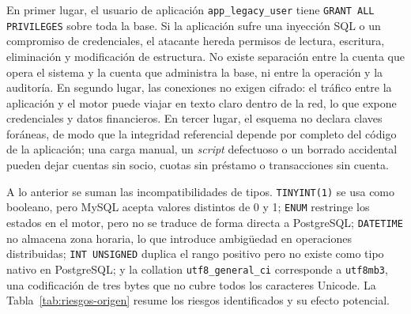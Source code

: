 En primer lugar, el usuario de aplicación \texttt{app\_legacy\_user} tiene
\texttt{GRANT ALL PRIVILEGES} sobre toda la base. Si la aplicación sufre una
inyección SQL o un compromiso de credenciales, el atacante hereda permisos de
lectura, escritura, eliminación y modificación de estructura. No existe
separación entre la cuenta que opera el sistema y la cuenta que administra la
base, ni entre la operación y la auditoría. En segundo lugar, las conexiones
no exigen cifrado: el tráfico entre la aplicación y el motor puede viajar en
texto claro dentro de la red, lo que expone credenciales y datos financieros.
En tercer lugar, el esquema no declara claves foráneas, de modo que la
integridad referencial depende por completo del código de la aplicación; una
carga manual, un \emph{script} defectuoso o un borrado accidental pueden dejar
cuentas sin socio, cuotas sin préstamo o transacciones sin cuenta.

A lo anterior se suman las incompatibilidades de tipos. \texttt{TINYINT(1)}
se usa como booleano, pero MySQL acepta valores distintos de 0 y 1;
\texttt{ENUM} restringe los estados en el motor, pero no se traduce de forma
directa a PostgreSQL; \texttt{DATETIME} no almacena zona horaria, lo que
introduce ambigüedad en operaciones distribuidas; \texttt{INT UNSIGNED}
duplica el rango positivo pero no existe como tipo nativo en PostgreSQL; y la
collation \texttt{utf8\_general\_ci} corresponde a \texttt{utf8mb3}, una
codificación de tres bytes que no cubre todos los caracteres Unicode. La
Tabla~\ref{tab:riesgos-origen} resume los riesgos identificados y su efecto
potencial.

